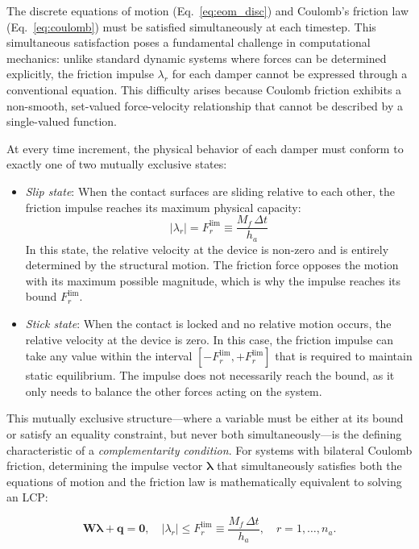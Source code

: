 \documentclass[preprint,12pt,authoryear]{elsarticle}
\newcommand{\Mf}{M_{\!f}}
\newcommand{\ha}{h_a}
\begin{document}
The discrete equations of motion (Eq.~\ref{eq:eom_disc}) and Coulomb's friction law (Eq.~\ref{eq:coulomb}) must be satisfied simultaneously at each timestep. This simultaneous satisfaction poses a fundamental challenge in computational mechanics: unlike standard dynamic systems where forces can be determined explicitly, the friction impulse $\lambda_r$ for each damper cannot be expressed through a conventional equation. This difficulty arises because Coulomb friction exhibits a non-smooth, set-valued force-velocity relationship that cannot be described by a single-valued function.

At every time increment, the physical behavior of each damper must conform to exactly one of two mutually exclusive states:

\begin{itemize}
\item \textit{Slip state}: When the contact surfaces are sliding relative to each other, the friction impulse reaches its maximum physical capacity:
\[ |\lambda_r| = F^{\lim}_r \equiv \frac{\Mf\,\Delta t}{\ha} \]
In this state, the relative velocity at the device is non-zero and is entirely determined by the structural motion. The friction force opposes the motion with its maximum possible magnitude, which is why the impulse reaches its bound $F^{\lim}_r$.

\item \textit{Stick state}: When the contact is locked and no relative motion occurs, the relative velocity at the device is zero. In this case, the friction impulse can take any value within the interval $[-F^{\lim}_r, +F^{\lim}_r]$ that is required to maintain static equilibrium. The impulse does not necessarily reach the bound, as it only needs to balance the other forces acting on the system.
\end{itemize}

This mutually exclusive structure---where a variable must be either at its bound or satisfy an equality constraint, but never both simultaneously---is the defining characteristic of a \textit{complementarity condition}. For systems with bilateral Coulomb friction, determining the impulse vector $\bm{\lambda}$ that simultaneously satisfies both the equations of motion and the friction law is mathematically equivalent to solving an LCP:

\begin{equation}
	\bm{W}\bm{\lambda} + \bm{q} = \bm{0},
	\quad |\lambda_r| \leq F^{\lim}_r \equiv \frac{\Mf\,\Delta t}{\ha},
	\quad r = 1,\ldots,n_a.
	\label{eq:lcp}
\end{equation}
\end{document}
